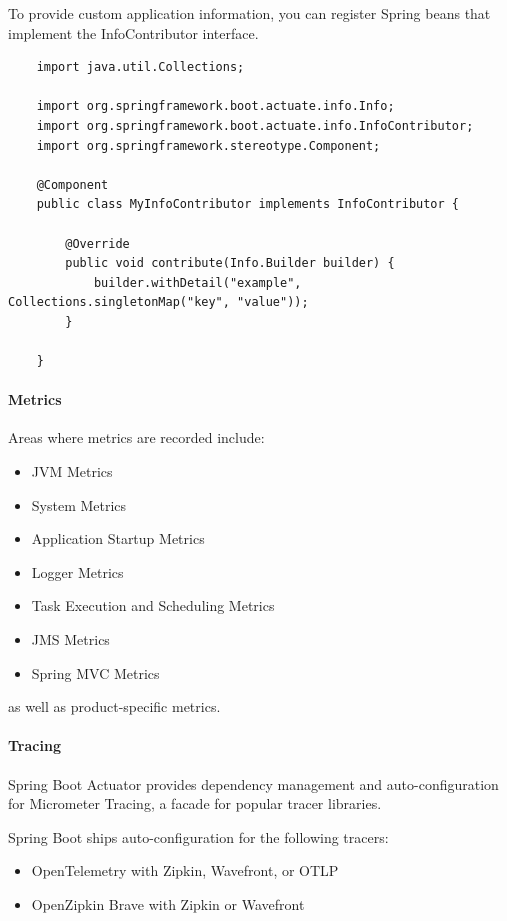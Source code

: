 \documentclass{scrartcl}
\begin{document}
    To provide custom application information, you can register Spring beans that implement the InfoContributor interface.

\begin{lstlisting}
    import java.util.Collections;

    import org.springframework.boot.actuate.info.Info;
    import org.springframework.boot.actuate.info.InfoContributor;
    import org.springframework.stereotype.Component;

    @Component
    public class MyInfoContributor implements InfoContributor {

        @Override
        public void contribute(Info.Builder builder) {
            builder.withDetail("example", Collections.singletonMap("key", "value"));
        }

    }
\end{lstlisting}

\paragraph{Metrics}

Areas where metrics are recorded include:

\begin{itemize}
    \item JVM Metrics
    \item System Metrics
    \item Application Startup Metrics
    \item Logger Metrics
    \item Task Execution and Scheduling Metrics
    \item JMS Metrics
    \item Spring MVC Metrics
\end{itemize}

as well as product-specific metrics.

\paragraph{Tracing}

Spring Boot Actuator provides dependency management and auto-configuration for Micrometer Tracing, a facade for popular tracer libraries.

Spring Boot ships auto-configuration for the following tracers:

\begin{itemize}
    \item OpenTelemetry with Zipkin, Wavefront, or OTLP
    \item OpenZipkin Brave with Zipkin or Wavefront
\end{itemize}
\end{document}
